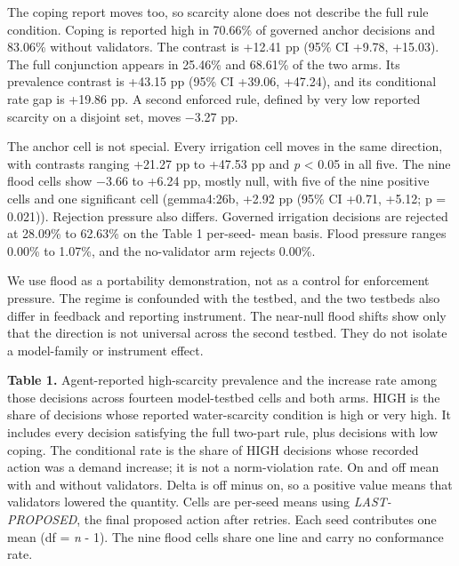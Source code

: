 \documentclass{article}
\begin{document}
The coping report moves too, so scarcity alone does not describe the full rule condition. Coping is reported high in 70.66\% of governed anchor decisions and 83.06\% without validators. The contrast is +12.41 pp (95\% CI +9.78, +15.03). The full conjunction appears in 25.46\% and 68.61\% of the two arms. Its prevalence contrast is +43.15 pp (95\% CI +39.06, +47.24), and its conditional rate gap is +19.86 pp. A second enforced rule, defined by very low reported scarcity on a disjoint set, moves $-$3.27 pp.

The anchor cell is not special. Every irrigation cell moves in the same direction, with contrasts ranging +21.27 pp to +47.53 pp and \textit{p} < 0.05 in all five. The nine flood cells show $-$3.66 to +6.24 pp, mostly null, with five of the nine positive cells and one significant cell (gemma4:26b, +2.92 pp (95\% CI +0.71, +5.12; p = 0.021)). Rejection pressure also differs. Governed irrigation decisions are rejected at 28.09\% to 62.63\% on the Table 1 per-seed- mean basis. Flood pressure ranges 0.00\% to 1.07\%, and the no-validator arm rejects 0.00\%.

We use flood as a portability demonstration, not as a control for enforcement pressure. The regime is confounded with the testbed, and the two testbeds also differ in feedback and reporting instrument. The near-null flood shifts show only that the direction is not universal across the second testbed. They do not isolate a model-family or instrument effect.

\textbf{Table 1.} Agent-reported high-scarcity prevalence and the increase rate among those decisions across fourteen model-testbed cells and both arms. HIGH is the share of decisions whose reported water-scarcity condition is high or very high. It includes every decision satisfying the full two-part rule, plus decisions with low coping. The conditional rate is the share of HIGH decisions whose recorded action was a demand increase; it is not a norm-violation rate. On and off mean with and without validators. Delta is off minus on, so a positive value means that validators lowered the quantity. Cells are per-seed means using \textit{LAST-PROPOSED}, the final proposed action after retries. Each seed contributes one mean (df = \textit{n} - 1). The nine flood cells share one line and carry no conformance rate.
\end{document}
